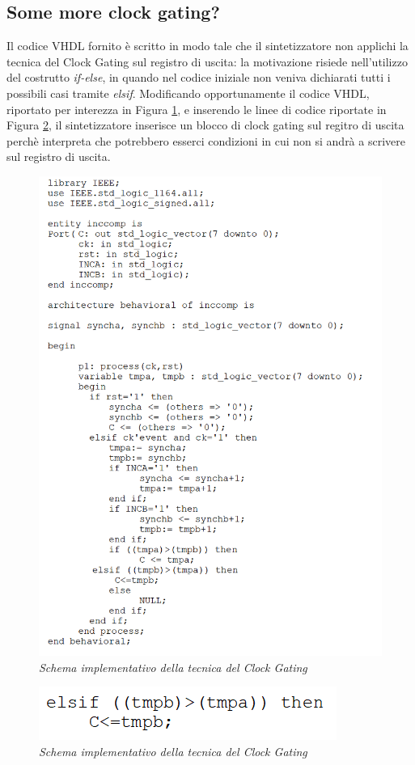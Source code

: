 \subsection{Some more clock gating?}
Il codice VHDL fornito è scritto in modo tale che il sintetizzatore non applichi la tecnica del Clock Gating sul registro di uscita: la motivazione risiede nell'utilizzo del costrutto \textit{if-else}, in quando nel codice iniziale non veniva dichiarati tutti i possibili casi tramite \textit{elsif}. Modificando opportunamente il codice VHDL,  riportato per interezza in Figura \ref{3_vhdl}, e inserendo le linee di codice riportate in Figura \ref{3_vhdl_2}, il sintetizzatore inserisce un blocco di clock gating sul regitro di uscita perchè interpreta che potrebbero esserci condizioni in cui non si andrà a scrivere sul registro di uscita.
\begin{figure}[!htb]
	\centering
	\includegraphics[scale=1]{immagini/3_vhdl}
	\caption{\textit{Schema implementativo della tecnica del Clock Gating}}
	\label{3_vhdl}
\end{figure}
\begin{figure}[!htb]
	\centering
	\includegraphics[scale=1.5]{immagini/3_vhdl_2}
	\caption{\textit{Schema implementativo della tecnica del Clock Gating}}
	\label{3_vhdl_2}
\end{figure}

